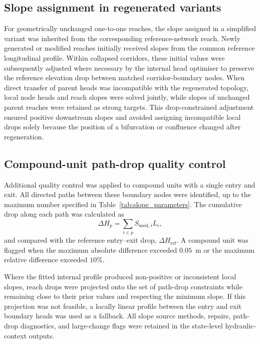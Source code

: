 \subsection{Slope assignment in regenerated variants}

For geometrically unchanged one-to-one reaches, the slope assigned in a simplified variant was inherited from the corresponding reference-network reach. Newly generated or modified reaches initially received slopes from the common reference longitudinal profile. Within collapsed corridors, these initial values were subsequently adjusted where necessary by the internal head optimiser to preserve the reference elevation drop between matched corridor-boundary nodes. When direct transfer of parent heads was incompatible with the regenerated topology, local node heads and reach slopes were solved jointly, while slopes of unchanged parent reaches were retained as strong targets. This drop-constrained adjustment ensured positive downstream slopes and avoided assigning incompatible local drops solely because the position of a bifurcation or confluence changed after regeneration.

\subsection{Compound-unit path-drop quality control}

Additional quality control was applied to compound units with a single entry and exit. All directed paths between these boundary nodes were identified, up to the maximum number specified in Table~\ref{tab:slope_parameters}. The cumulative drop along each path was calculated as
\begin{equation}
\Delta H_p=\sum_{i\in p}S_{\mathrm{used},i}L_i,
\end{equation}
and compared with the reference entry--exit drop, $\Delta H_{\mathrm{ref}}$. A compound unit was flagged when the maximum absolute difference exceeded $0.05$~m or the maximum relative difference exceeded $10\%$.

Where the fitted internal profile produced non-positive or inconsistent local slopes, reach drops were projected onto the set of path-drop constraints while remaining close to their prior values and respecting the minimum slope. If this projection was not feasible, a locally linear profile between the entry and exit boundary heads was used as a fallback. All slope source methods, repairs, path-drop diagnostics, and large-change flags were retained in the state-level hydraulic-context outputs.
